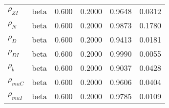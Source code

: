 \begin{center}
\begin{longtable}{llcccc}
${\rho_{ZI}}$ & beta &   0.600 & 0.2000 &   0.9648 &  0.0312 \\ 
${\rho_N}$ & beta &   0.600 & 0.2000 &   0.9873 &  0.1780 \\ 
${\rho_D}$ & beta &   0.600 & 0.2000 &   0.9413 &  0.0181 \\ 
${\rho_{DI}}$ & beta &   0.600 & 0.2000 &   0.9990 &  0.0055 \\ 
${\rho_b}$ & beta &   0.600 & 0.2000 &   0.9037 &  0.0428 \\ 
${\rho_{muC}}$ & beta &   0.600 & 0.2000 &   0.9606 &  0.0404 \\ 
${\rho_{muI}}$ & beta &   0.600 & 0.2000 &   0.9785 &  0.0109 \\ 
\end{longtable}
 \end{center}
